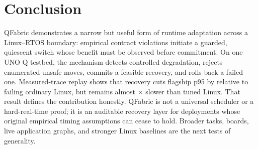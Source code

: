 \documentclass[conference]{IEEEtran}
\newcommand{\system}{QFabric\xspace}
\begin{document}
\section{Conclusion}
\system demonstrates a narrow but useful form of runtime adaptation across a
Linux--RTOS boundary: empirical contract violations initiate a guarded,
quiescent switch whose benefit must be observed before commitment. On one UNO Q
testbed, the mechanism detects controlled degradation, rejects enumerated unsafe
moves, commits a feasible recovery, and rolls back a failed one. Measured-trace
replay shows that recovery cuts flagship p95 by \RecoveryImprovement relative
to failing ordinary Linux, but remains almost \RecoveryTunedRatio$\times$ slower
than tuned Linux. That result defines the contribution honestly. QFabric is not
a universal scheduler or a hard-real-time proof; it is an auditable recovery
layer for deployments whose original empirical timing assumptions can cease to
hold. Broader tasks, boards, live application graphs, and stronger Linux
baselines are the next tests of generality.



\end{document}
